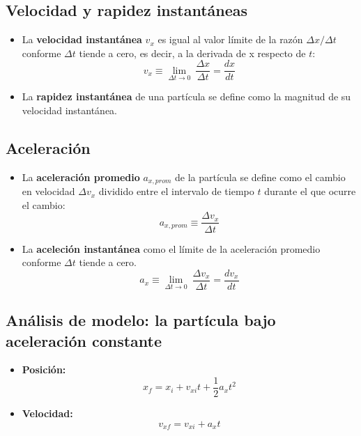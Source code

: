   \subsection{Velocidad y rapidez instantáneas}
    \begin{itemize}
      \item La \textbf{velocidad instantánea} $v_{x}$ es igual al valor límite de la razón $\Delta x / \Delta t$
      conforme $\Delta t$ tiende a cero, es decir, a la derivada de x respecto de $t$:
      \begin{equation*}
        v_{x} \equiv \lim_{\Delta t \rightarrow 0} \ \frac{\Delta x}{\Delta t} = \frac{dx}{dt}
      \end{equation*}

      \item La \textbf{rapidez instantánea} de una partícula se define como la magnitud de su velocidad instantánea.
    \end{itemize}

  \subsection{Aceleración}
    \begin{itemize}
      \item La \textbf{aceleración promedio} $a_{x,prom}$ de la partícula se define como el cambio en velocidad $\Delta
      v_{x}$ dividido entre el intervalo de tiempo $t$ durante el que ocurre el cambio:
      \begin{equation*}
        a_{x,prom} \equiv \frac{\Delta v_{x}}{\Delta t}
      \end{equation*}

      \item La \textbf{aceleción instantánea} como el límite de la aceleración promedio conforme $\Delta t$ tiende a
      cero.
      \begin{equation*}
        a_{x} \equiv \lim_{\Delta t \rightarrow 0} \ \frac{\Delta v_{x}}{\Delta t} = \frac{dv_{x}}{dt}
      \end{equation*}
    \end{itemize}

  \subsection{Análisis de modelo: la partícula bajo aceleración constante}
    \begin{itemize}
      \item \textbf{Posición:}
      \begin{equation*}
        x_{f} = x_{i} + v_{xi} t + \frac{1}{2} a_{x}t^{2}
      \end{equation*}
      \item \textbf{Velocidad:}
      \begin{equation*}
        v_{xf} = v_{xi} + a_{x} t
      \end{equation*}
    \end{itemize}
